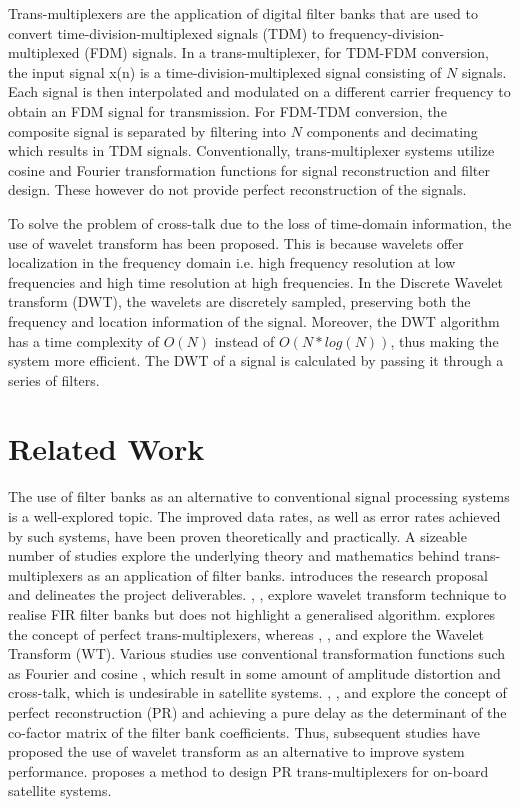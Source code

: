 \documentclass[conference]{IEEEtran}
\begin{document}
Trans-multiplexers are the application of digital filter banks that are used to convert time-division-multiplexed signals (TDM) to frequency-division-multiplexed (FDM) signals. In a trans-multiplexer, for TDM-FDM conversion, the input signal {x(n)} is a time-division-multiplexed signal consisting of $N$ signals. Each signal is then interpolated and modulated on a different carrier frequency to obtain an FDM signal for transmission. For FDM-TDM conversion, the composite signal is separated by filtering into $N$ components and decimating which results in TDM signals. Conventionally, trans-multiplexer systems utilize cosine and Fourier transformation functions for signal reconstruction and filter design. These however do not provide perfect reconstruction of the signals. \par

To solve the problem of cross-talk due to the loss of time-domain information, the use of wavelet transform has been proposed. This is because wavelets offer localization in the frequency domain i.e. high frequency resolution at low frequencies and high time resolution at high frequencies. In the Discrete Wavelet transform (DWT), the wavelets are discretely sampled, preserving both the frequency and location information of the signal. Moreover, the DWT algorithm has a time complexity of $O(N)$ instead of $O(N*log(N))$, thus making the system more efficient. The DWT of a signal is calculated by passing it through a series of filters.

\section{Related Work}

The use of filter banks as an alternative to conventional signal processing systems is a well-explored topic. The improved data rates, as well as error rates achieved by such systems, have been proven theoretically and practically. A sizeable number of studies explore the underlying theory and mathematics behind trans-multiplexers as an application of filter banks. \cite{b1}  introduces the research proposal and delineates the project deliverables. \cite{b2}, \cite{b3}, \cite{b5} explore wavelet transform technique to realise FIR filter banks but does not highlight a generalised algorithm.  \cite{b9} explores the concept of perfect trans-multiplexers, whereas \cite{b4}, \cite{mallat_paper}, and \cite{b16} explore the Wavelet Transform (WT). Various studies use conventional transformation functions such as Fourier and cosine \cite{b6} \cite{b10}, which result in some amount of amplitude distortion and cross-talk, which is undesirable in satellite systems. \cite{b7}, \cite{b8}, \cite{b14} and \cite{b13} explore the concept of perfect reconstruction (PR) and achieving a pure delay as the determinant of the co-factor matrix of the filter bank coefficients. Thus, subsequent studies have proposed the use of wavelet transform \cite{b2} \cite{b5} \cite{b11} as an alternative to improve system performance. \cite{b15} proposes a method to design PR trans-multiplexers for on-board satellite systems.
\end{document}
